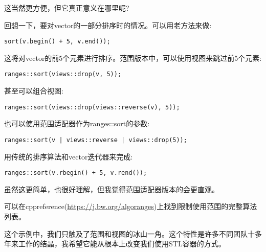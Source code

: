 这当然更方便，但它真正意义在哪里呢?

回想一下，要对vector的一部分排序时的情况。可以用老方法来做:

\begin{lstlisting}[style=styleCXX]
sort(v.begin() + 5, v.end());
\end{lstlisting}

这将对vector的前5个元素进行排序。范围版本中，可以使用视图来跳过前5个元素:

\begin{lstlisting}[style=styleCXX]
ranges::sort(views::drop(v, 5));
\end{lstlisting}

甚至可以组合视图:

\begin{lstlisting}[style=styleCXX]
ranges::sort(views::drop(views::reverse(v), 5));
\end{lstlisting}

也可以使用范围适配器作为ranges::sort的参数:

\begin{lstlisting}[style=styleCXX]
ranges::sort(v | views::reverse | views::drop(5));
\end{lstlisting}

用传统的排序算法和vector迭代器来完成:

\begin{lstlisting}[style=styleCXX]
ranges::sort(v.rbegin() + 5, v.rend());
\end{lstlisting}

虽然这更简单，也很好理解，但我觉得范围适配器版本的会更直观。

可以在cppreference(\url{https://j.bw.org/algoranges})上找到限制使用范围的完整算法列表。

这个示例中，我们只触及了范围和视图的冰山一角。这个特性是许多不同团队十多年来工作的结晶，我希望它能从根本上改变我们使用STL容器的方式。
























